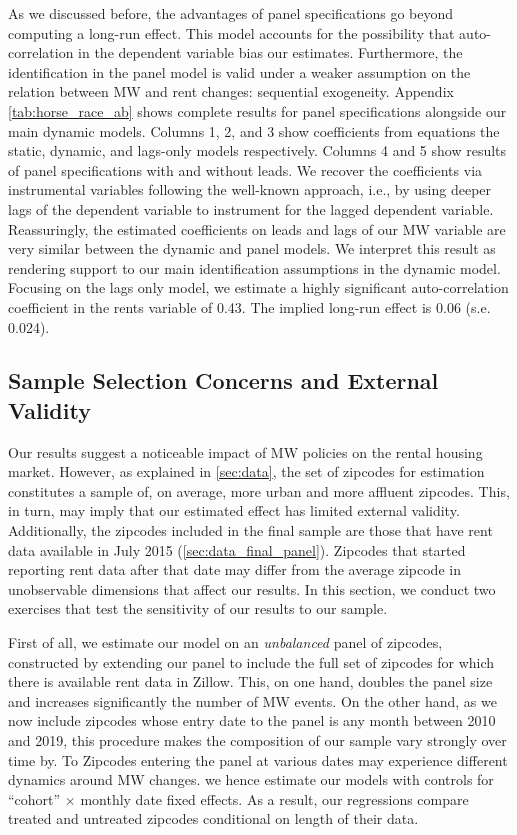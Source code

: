 As we discussed before, the advantages of panel specifications go beyond computing a long-run effect.
This model accounts for the possibility that auto-correlation in the dependent variable bias our 
estimates. Furthermore, the identification in the panel model is valid under a weaker assumption on 
the relation between MW and rent changes: sequential exogeneity. Appendix \autoref{tab:horse_race_ab} shows complete results for panel specifications alongside our main dynamic models. Columns 1, 
2, and 3 show coefficients from equations the static, dynamic, and lags-only models respectively. Columns 
4 and 5 show results of panel specifications with and without leads. We recover the coefficients via 
instrumental variables following the well-known \textcite{ArellanoBond1991} approach, i.e., by using 
deeper lags of the dependent variable to instrument for the lagged dependent variable. Reassuringly, 
the estimated coefficients on leads and lags of our MW variable are very similar between the dynamic
and panel models. We interpret this result as rendering support to our main identification assumptions
in the dynamic model. Focusing on the lags only model, we estimate a highly significant auto-correlation 
coefficient in the rents variable of 0.43. The implied long-run effect is 0.06 (s.e. 0.024).



\subsection{Sample Selection Concerns and External Validity}\label{sec:sample_rest}

Our results suggest a noticeable impact of MW policies on the rental housing market. However, as 
explained in \autoref{sec:data}, the set of zipcodes for estimation constitutes a sample of, on 
average, more urban and more affluent zipcodes. This, in turn, may imply that our estimated effect has 
limited external validity. Additionally, the zipcodes included in the final sample are those that 
have rent data available in July 2015 (\autoref{sec:data_final_panel}). Zipcodes that started reporting rent data after that 
date may differ from the average zipcode in unobservable dimensions that affect our results. 
In this section, we conduct two exercises that test the sensitivity of our results to our sample.

First of all, we estimate our model on an \textit{unbalanced} panel of zipcodes, constructed by 
extending our panel to include the full set of zipcodes for which there is available rent data in 
Zillow. This, on one hand, doubles the panel size and increases significantly the number of MW 
events. %
On the other hand, as we now include zipcodes whose entry date to the panel is any month between
2010 and 2019, this procedure makes the composition of our sample vary strongly over time by. To 
Zipcodes entering the panel at various dates may experience different dynamics around MW changes.  
we hence estimate our models with controls for ``cohort'' $\times$ monthly date fixed effects. 
As a result, our regressions compare treated and untreated zipcodes conditional on length of their 
data.

